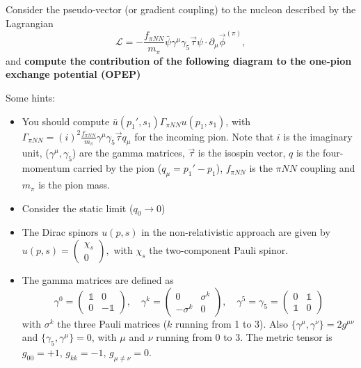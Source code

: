 
Consider the pseudo-vector (or gradient coupling) to the nucleon described by the Lagrangian
\begin{equation}
    \mathcal{L}=-\frac{f_{\pi NN}}{m_{\pi}} \bar \psi \gamma^{\mu} \gamma_5 \vec{\tau} \psi \cdot \partial_{\mu} \vec{\phi}^{(\pi)} ,
\end{equation}
and {\bf compute the contribution of the following diagram to the one-pion exchange potential (OPEP)}

Some hints:
\begin{itemize}
    \item You should compute $\bar u (p_1',s_1) \Gamma_{\pi NN} u(p_1,s_1)$, with $\Gamma_{\pi NN}= (i)^2 \frac{f_{\pi NN}}{m_{\pi}} \gamma^{\mu}  \gamma_5 \vec{\tau} q_{\mu}$ for the incoming pion.
          Note that $i$ is the imaginary unit, ($\gamma^{\mu},  \gamma_5$) are  the gamma matrices, $\vec{\tau}$ is  the isospin vector,  $q$ is the four-momentum carried by the pion ($q_{\mu}=p_1'-p_1$),  ${f_{\pi NN}}$ is the ${\pi NN}$ coupling and $m_{\pi}$ is the pion mass.
    \item Consider the static limit ($q_0 \rightarrow 0$)
    \item The Dirac spinors $u(p,s)$ in the non-relativistic approach are given by $u(p,s)=\left( \begin{array} {c}
                  \chi_s \\
                  0
              \end{array} \right) ,$
          with $\chi_s$ the two-component Pauli spinor.
    \item The gamma matrices are defined as
          \begin{equation}
              \gamma^0=
              \left( \begin{array} {cc}
                  \mathbb{1} & 0           \\
                  0          & -\mathbb{1}
              \end{array} \right),\quad
              \gamma^k=
              \left( \begin{array} {cc}
                  0         & \sigma^k \\
                  -\sigma^k & 0
              \end{array} \right) ,\quad
              \gamma^5=\gamma_5=
              \left( \begin{array} {cc}
                  0          & \mathbb{1} \\
                  \mathbb{1} & 0
              \end{array} \right)
              \nonumber
          \end{equation}
          with  $\sigma^k$ the three Pauli matrices ($k$ running from 1 to 3). Also
          $ \lbrace \gamma^{\mu}, \gamma^{\nu} \rbrace= 2 g^{\mu \nu}$ and $\lbrace \gamma_5,\gamma^{\mu} \rbrace =0$, with $\mu$ and $\nu$ running from 0 to 3. The metric tensor is $g_{00}=+1$, $g_{kk}=-1$, $g_{\mu \neq \nu}=0$.

\end{itemize}


